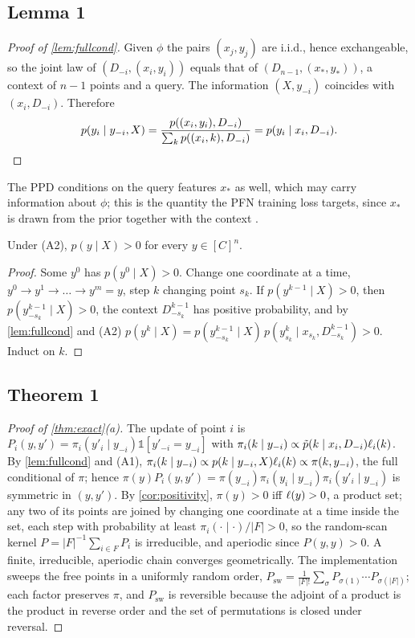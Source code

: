 \subsection{Lemma 1}
\begin{proof}[Proof of \cref{lem:fullcond}]
Given $\phi$ the pairs $(x_j,y_j)$ are i.i.d., hence exchangeable, so the joint law of $(D_{-i},(x_i,y_i))$ equals that of
$(D_{n-1},(x_*,y_*))$, a context of $n-1$ points and a query. The information $(X,y_{-i})$ coincides with $(x_i,D_{-i})$.
Therefore
\[p(y_i\mid y_{-i},X)=\frac{p((x_i,y_i),D_{-i})}{\sum_kp((x_i,k),D_{-i})}=p(y_i\mid x_i,D_{-i}).\qedhere\]
\end{proof}
The PPD conditions on the query features $x_*$ as well, which may carry information about $\phi$; this is the quantity
the PFN training loss targets, since $x_*$ is drawn from the prior together with the context \citep{muller2022pfn}.

\begin{corollary}[Positivity]\label{cor:positivity}
Under (A2), $p(y\mid X)>0$ for every $y\in[C]^n$.
\end{corollary}
\begin{proof}
Some $y^0$ has $p(y^0\mid X)>0$. Change one coordinate at a time, $y^0\to y^1\to\dots\to y^m=y$, step $k$ changing
point $s_k$. If $p(y^{k-1}\mid X)>0$, then $p(y^{k-1}_{-s_k}\mid X)>0$, the context $D^{k-1}_{-s_k}$ has positive
probability, and by \cref{lem:fullcond} and (A2)
$p(y^k\mid X)=p(y^{k-1}_{-s_k}\mid X)\,p(y^k_{s_k}\mid x_{s_k},D^{k-1}_{-s_k})>0$. Induct on $k$.
\end{proof}

\subsection{Theorem 1}
\begin{proof}[Proof of \cref{thm:exact}(a)]
The update of point $i$ is $P_i(y,y')=\pi_i(y'_i\mid y_{-i})\mathbb 1[y'_{-i}=y_{-i}]$ with
$\pi_i(k\mid y_{-i})\propto\tilde p(k\mid x_i,D_{-i})\ell_i(k)$. By \cref{lem:fullcond} and (A1),
$\pi_i(k\mid y_{-i})\propto p(k\mid y_{-i},X)\ell_i(k)\propto\pi(k,y_{-i})$, the full conditional of $\pi$; hence
$\pi(y)P_i(y,y')=\pi(y_{-i})\pi_i(y_i\mid y_{-i})\pi_i(y'_i\mid y_{-i})$ is symmetric in $(y,y')$. By
\cref{cor:positivity}, $\pi(y)>0$ iff $\ell(y)>0$, a product set; any two of its points are joined by changing one
coordinate at a time inside the set, each step with probability at least $\pi_i(\cdot\mid\cdot)/\lvert F\rvert>0$, so the
random-scan kernel $P=\lvert F\rvert^{-1}\sum_{i\in F}P_i$ is irreducible, and aperiodic since $P(y,y)>0$. A finite,
irreducible, aperiodic chain converges geometrically. The implementation sweeps the free points in a uniformly random
order, $P_{\mathrm{sw}}=\frac1{\lvert F\rvert!}\sum_\sigma P_{\sigma(1)}\cdots P_{\sigma(\lvert F\rvert)}$; each factor
preserves $\pi$, and $P_{\mathrm{sw}}$ is reversible because the adjoint of a product is the product in reverse order and
the set of permutations is closed under reversal.
\end{proof}


